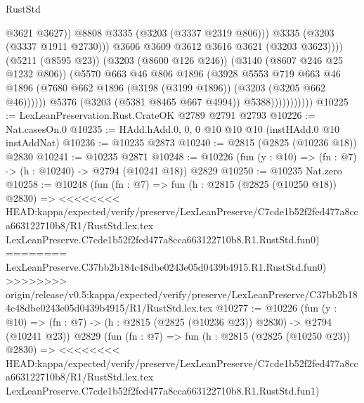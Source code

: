\begin{lexlean}{RustStd}
\begin{coremodule}
{\begin{coremodule}
{{{{{{{{{{{{{{{                                          @3621
                                          @3627))
                                      @8808
                                      @3335
                                      (@3203 (@3337 @2319 @806)))
                                    @3335
                                    (@3203 (@3337 @1911 @2730)))
                                  @3606
                                  @3609
                                  @3612
                                  @3616
                                  @3621
                                  (@3203 @3623))))
                            (@5211 (@8595 @23))
                            (@3203 (@8600 @126 @246))
                            (@3140 (@8607 @246 @25 @1232 @806))
                            (@5570
                              @663
                              @46
                              @806
                              @1896
                              (@3928
                                @5553
                                @719
                                @663
                                @46
                                @1896
                                (@7680 @662 @1896 (@3198 (@3199 @1896)) (@3203 (@3205 @662 @46))))))
                          @5376
                          (@3203 (@5381 @8465 @667 @4994))
                          @5388)))))))))))
@10225 := LexLeanPreservation.Rust.CrateOK @2789 @2791 @2793
@10226 := Nat.casesOn.{0}
@10235 := HAdd.hAdd.{0, 0, 0} @10 @10 @10 (instHAdd.{0} @10 instAddNat)
@10236 := @10235 @2873
@10240 := @2815 (@2825 (@10236 @18)) @2830
@10241 := @10235 @2871
@10248 := @10226 (fun (y : @10) => (fn : @7) -> (h : @10240) -> @2794 (@10241 @18)) @2829
@10250 := @10235 Nat.zero
@10258 := @10248
    (fun (fn : @7) =>
    fun (h : @2815 (@2825 (@10250 @18)) @2830) =>
<<<<<<<< HEAD:kappa/expected/verify/preserve/LexLeanPreserve/C7cde1b52f2fed477a8cca663122710b8/R1/RustStd.lex.tex
    LexLeanPreserve.C7cde1b52f2fed477a8cca663122710b8.R1.RustStd.fun0)
========
    LexLeanPreserve.C37bb2b184c48dbe0243e05d0439b4915.R1.RustStd.fun0)
>>>>>>>> origin/release/v0.5:kappa/expected/verify/preserve/LexLeanPreserve/C37bb2b184c48dbe0243e05d0439b4915/R1/RustStd.lex.tex
@10277 := @10226
    (fun (y : @10) => (fn : @7) -> (h : @2815 (@2825 (@10236 @23)) @2830) -> @2794 (@10241 @23))
    @2829
    (fun (fn : @7) =>
    fun (h : @2815 (@2825 (@10250 @23)) @2830) =>
<<<<<<<< HEAD:kappa/expected/verify/preserve/LexLeanPreserve/C7cde1b52f2fed477a8cca663122710b8/R1/RustStd.lex.tex
    LexLeanPreserve.C7cde1b52f2fed477a8cca663122710b8.R1.RustStd.fun1)
}}}}}}}}}}}}}}}
\end{coremodule}}
\end{coremodule}
\end{lexlean}
